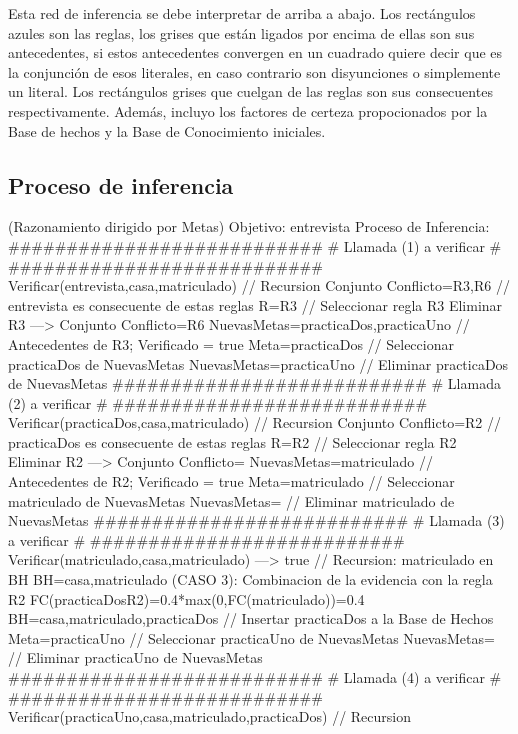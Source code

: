 \par Esta red de inferencia se debe interpretar de arriba a abajo.
Los rectángulos azules son las reglas, los grises que están ligados por encima 
de ellas son sus antecedentes, si estos antecedentes convergen en un cuadrado 
quiere decir que es la conjunción de esos literales, en caso contrario son disyunciones
o simplemente un literal. Los rectángulos grises que cuelgan de las reglas 
son sus consecuentes respectivamente. Además, incluyo los factores de certeza propocionados por
la Base de hechos y la Base de Conocimiento iniciales.

\subsection{Proceso de inferencia}
\begin{listing}[language=Pascal]
(Razonamiento dirigido por Metas)
Objetivo: entrevista
Proceso de Inferencia: 
  ###########################
  # Llamada (1) a verificar #
  ###########################
	Verificar(entrevista,{casa,matriculado}) // Recursion 
	Conjunto Conflicto={R3,R6} // entrevista es consecuente de estas reglas
	R={R3} // Seleccionar regla R3
	Eliminar R3 ---> Conjunto Conflicto={R6}
	NuevasMetas={practicaDos,practicaUno} // Antecedentes de R3; Verificado = true
	Meta=practicaDos // Seleccionar practicaDos de NuevasMetas
	NuevasMetas={practicaUno} // Eliminar practicaDos de NuevasMetas
  ###########################
  # Llamada (2) a verificar #
  ###########################
	Verificar(practicaDos,{casa,matriculado}) // Recursion 
	Conjunto Conflicto={R2} // practicaDos es consecuente de estas reglas
	R={R2} // Seleccionar regla R2
	Eliminar R2 ---> Conjunto Conflicto={}
	NuevasMetas={matriculado} // Antecedentes de R2; Verificado = true
	Meta=matriculado // Seleccionar matriculado de NuevasMetas
	NuevasMetas={} // Eliminar matriculado de NuevasMetas
  ###########################
  # Llamada (3) a verificar #
  ###########################
	Verificar(matriculado,{casa,matriculado}) ---> true // Recursion: matriculado en BH
	BH={casa,matriculado}
	(CASO 3): Combinacion de la evidencia con la regla R2
	 FC(practicaDos{R2})=0.4*max(0,FC(matriculado))=0.4
	BH={casa,matriculado,practicaDos} // Insertar practicaDos a la Base de Hechos
	Meta=practicaUno // Seleccionar practicaUno de NuevasMetas
	NuevasMetas={} // Eliminar practicaUno de NuevasMetas
  ###########################
  # Llamada (4) a verificar #
  ###########################
	Verificar(practicaUno,{casa,matriculado,practicaDos}) // Recursion 

\end{listing}
